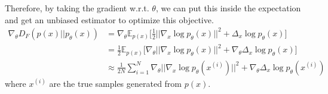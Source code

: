     Therefore, by taking the gradient w.r.t. $\theta$, we can put this inside the expectation and get an unbiased estimator to optimize this objective. 
    \begin{align}
      \nabla_\theta  D_F (p(x) || p_\theta (x)) & = \nabla_\theta \mathbb{E}_{p(x)} \bigg[ \frac{1}{2} || \nabla_x \log p_\theta (x) ||^2 + \Delta_x \log p_\theta (x) \bigg] \\
                                                & = \frac{1}{2} \mathbb{E}_{p(x)} \bigg[ \nabla_\theta || \nabla_x \log p_\theta (x) ||^2 + \nabla_\theta \Delta_x \log p_\theta (x) \bigg] \\ 
                                                & \approx \frac{1}{2N} \sum_{i=1}^N \nabla_\theta || \nabla_x \log p_\theta (x^{(i)}) ||^2 + \nabla_\theta \Delta_x \log p_\theta (x^{(i)}) 
    \end{align}
    where $x^{(i)}$ are the true samples generated from $p(x)$. 

